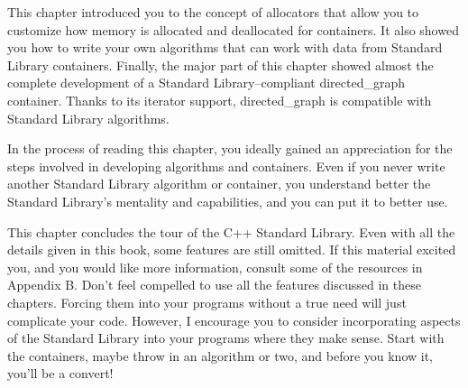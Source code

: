This chapter introduced you to the concept of allocators that allow you to customize how memory is allocated and deallocated for containers. It also showed you how to write your own algorithms that can work with data from Standard Library containers. Finally, the major part of this chapter showed almost the complete development of a Standard Library–compliant directed\_graph container. Thanks to its iterator support, directed\_graph is compatible with Standard Library algorithms.

In the process of reading this chapter, you ideally gained an appreciation for the steps involved in developing algorithms and containers. Even if you never write another Standard Library algorithm or container, you understand better the Standard Library’s mentality and capabilities, and you can put it to better use.

This chapter concludes the tour of the C++ Standard Library. Even with all the details given in this book, some features are still omitted. If this material excited you, and you would like more information, consult some of the resources in Appendix B. Don’t feel compelled to use all the features discussed in these chapters. Forcing them into your programs without a true need will just complicate your code. However, I encourage you to consider incorporating aspects of the Standard Library into your programs where they make sense. Start with the containers, maybe throw in an algorithm or two, and before you know it, you’ll be a convert!